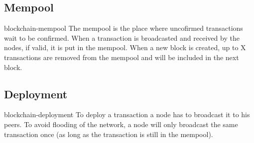 \documentclass[preview]{standalone}
\begin{document}
\subsection{Mempool}

\begin{snippet}{blockchain-mempool}
The mempool is the place where uncofirmed transactions
wait to be confirmed.
When a transaction is broadcasted and received by the nodes,
if valid, it is put in the mempool.
When a new block is created, up to X transactions are removed from the
mempool and will be included in the next block.
\end{snippet}

\subsection{Deployment}

\begin{snippet}{blockchain-deployment}
To deploy a transaction a node has to broadcast it to his peers.
To avoid flooding of the network, a node will only broadcast
the same transaction once (as long as the transaction is still in the mempool).
\end{snippet}
\end{document}
